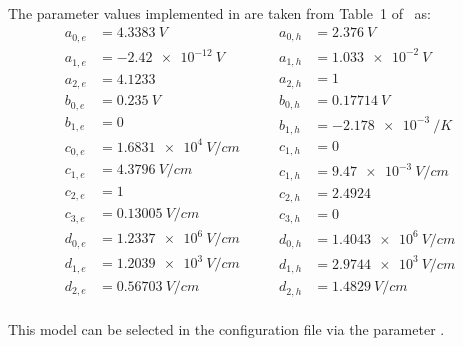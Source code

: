 The parameter values implemented in \apsq are taken from Table~1 of~\cite{bologna} as:
\begin{equation*}
    \begin{split}
        a_{0, e} &= \SI{4.3383}{V}\\
        a_{1, e} &= \SI{-2.42e-12}{V}\\
        a_{2, e} &= \num{4.1233}\\
        b_{0, e} &= \SI{0.235}{V}\\
        b_{1, e} &= 0\\
        c_{0, e} &= \SI{1.6831e4}{V/cm}\\
        c_{1, e} &= \SI{4.3796}{V/cm}\\
        c_{2, e} &= 1\\
        c_{3, e} &= \SI{0.13005}{V/cm}\\
        d_{0, e} &= \SI{1.2337e6}{V/cm}\\
        d_{1, e} &= \SI{1.2039e3}{V/cm}\\
        d_{2, e} &= \SI{0.56703}{V/cm}\\
    \end{split}
    \qquad
    \begin{split}
        a_{0, h} &= \SI{2.376}{V}\\
        a_{1, h} &= \SI{1.033e-2}{V}\\
        a_{2, h} &= 1\\
        b_{0, h} &= \SI{0.17714}{V}\\
        b_{1, h} &= \SI{-2.178e-3}{/K}\\
        c_{1, h} &= 0\\
        c_{1, h} &= \SI{9.47e-3}{V/cm}\\
        c_{2, h} &= \num{2.4924}\\
        c_{3, h} &= 0\\
        d_{0, h} &= \SI{1.4043e6}{V/cm}\\
        d_{1, h} &= \SI{2.9744e3}{V/cm}\\
        d_{2, h} &= \SI{1.4829}{V/cm}\\
    \end{split}
\end{equation*}

This model can be selected in the configuration file via the parameter .
